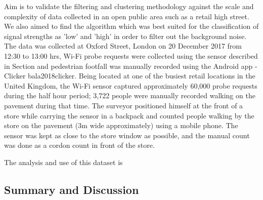 Aim is to validate the filtering and clustering methodology against the scale and complexity of data collected in an open public area such as a retail high street.
We also aimed to find the algorithm which was best suited for the classification of signal strengths as 'low' and 'high' in order to filter out the background noise.
The data was collected at Oxford Street, London on 20 December 2017 from 12:30 to 13:00 hrs, Wi-Fi probe requests were collected using the sensor described in Section and pedestrian footfall was manually recorded using the Android app - Clicker bala2018clicker.
Being located at one of the busiest retail locations in the United Kingdom, the Wi-Fi sensor captured approximately 60,000 probe requests during the half hour period; 3,722 people were manually recorded walking on the pavement during that time.
The surveyor positioned himself at the front of a store while carrying the sensor in a backpack and counted people walking by the store on the pavement (3m wide approximately) using a mobile phone.
The sensor was kept as close to the store window as possible, and the manual count was done as a cordon count in front of the store.

The analysis and use of this dataset is 

\subsection{Summary and Discussion}


